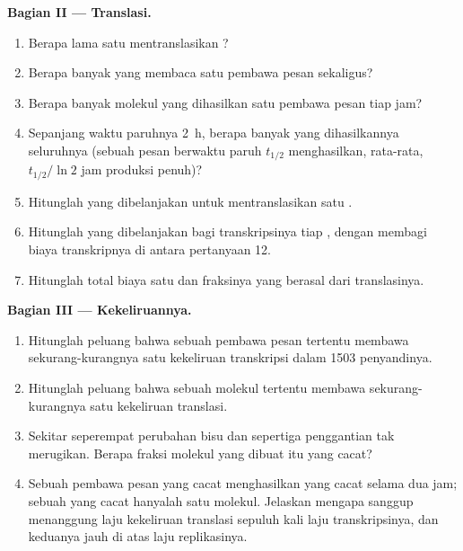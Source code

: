 \begin{problem}
\medskip
\noindent\textbf{Bagian II --- Translasi.}
\begin{enumerate}[resume]
  \item Berapa lama satu  mentranslasikan ?
  \item Berapa banyak  yang membaca satu pembawa pesan
        sekaligus?
  \item Berapa banyak molekul  yang dihasilkan satu pembawa
        pesan tiap jam?
  \item Sepanjang waktu paruhnya \qty{2}{h}, berapa banyak yang
        dihasilkannya seluruhnya (sebuah pesan berwaktu paruh
        $t_{1/2}$ menghasilkan, rata-rata, $t_{1/2}/\ln 2$ jam produksi
        penuh)?
  \item Hitunglah  yang dibelanjakan untuk mentranslasikan satu
        .
  \item Hitunglah  yang dibelanjakan bagi transkripsinya tiap
        , dengan membagi biaya transkripnya di antara 
        pertanyaan 12.
  \item Hitunglah total biaya satu  dan fraksinya yang berasal
        dari translasinya.
\end{enumerate}

\medskip
\noindent\textbf{Bagian III --- Kekeliruannya.}
\begin{enumerate}[resume]
  \item Hitunglah peluang bahwa sebuah pembawa pesan tertentu membawa
        sekurang-kurangnya satu kekeliruan transkripsi dalam
        \qty{1503}{}  penyandinya.
  \item Hitunglah peluang bahwa sebuah molekul  tertentu
        membawa sekurang-kurangnya satu kekeliruan translasi.
  \item Sekitar seperempat perubahan  bisu dan sepertiga
        penggantian  tak merugikan. Berapa fraksi molekul
         yang dibuat itu yang cacat?
  \item Sebuah pembawa pesan yang cacat menghasilkan  yang cacat
        selama dua jam; sebuah  yang cacat hanyalah satu molekul.
        Jelaskan mengapa  sanggup menanggung laju kekeliruan
        translasi sepuluh kali laju transkripsinya, dan keduanya jauh
        di atas laju replikasinya.
\end{enumerate}


\end{problem}
